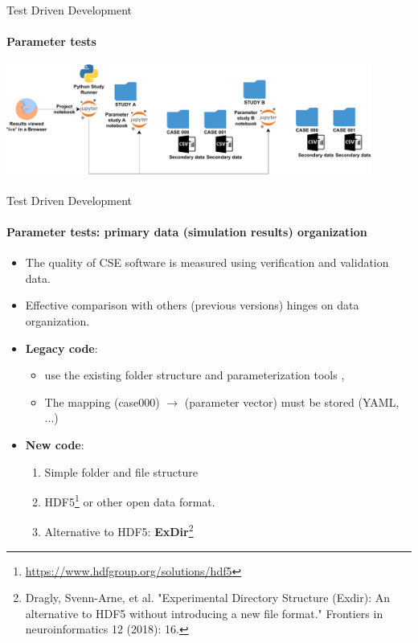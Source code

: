 \documentclass[
	aspectratio=169,%
	color={accentcolor=2d},
	logo=true,%
	colorframetitle=true,%
	]{tudabeamer}
\begin{document}
\begin{frame}{Test Driven Development} 
    \framesubtitle{Parameter tests}
    
    \vfill
    \begin{center}
            \includegraphics[width=0.9\textwidth]{figures/Cluster-Parameter-Study-Organization.pdf}
    \end{center}
\end{frame}

\begin{frame}{Test Driven Development} 
    \framesubtitle{Parameter tests: primary data (simulation results) organization}

    \begin{itemize}
        \item The quality of CSE software is measured using verification and validation data. 
        \item Effective comparison with others (previous versions) hinges on data organization.
    \end{itemize}
    
    \vfill
    \begin{itemize}
        \item \textbf{Legacy code}: 
            \begin{itemize}
                \item use the existing folder structure and parameterization tools \faGraduationCap,
                \item The mapping (case000) $\to$ (parameter vector) must be stored (YAML, ...)
            \end{itemize}
        \item \textbf{New code}: 
            \begin{enumerate}
                \item Simple folder and file structure \faGraduationCap
                \item HDF5\footnote{\url{https://www.hdfgroup.org/solutions/hdf5}} or other open data format.
                \item Alternative to HDF5: \textbf{ExDir}\footnote{Dragly, Svenn-Arne, et al. "Experimental Directory Structure (Exdir): An alternative to HDF5 without introducing a new file format." Frontiers in neuroinformatics 12 (2018): 16.} 
            \end{enumerate}
    \end{itemize}

\end{frame}
\end{document}

